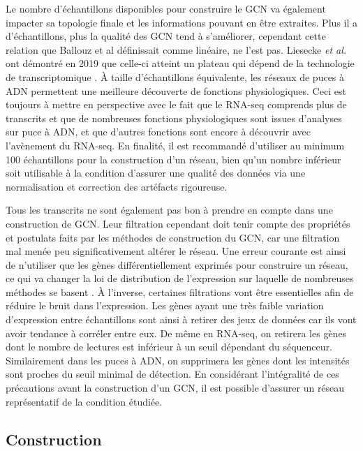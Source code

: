 Le nombre d'échantillons disponibles pour construire le \acrshort{GCN} va également impacter sa topologie finale et les informations pouvant en être extraites. Plus il a d'échantillons, plus la qualité des \acrshort{GCN} tend à s'améliorer, cependant cette relation que Ballouz et al définissait comme linéaire, ne l'est pas. Liesecke \textit{et al.} ont démontré en 2019 que celle-ci atteint un plateau qui dépend de la technologie de transcriptomique \cite{Liesecke2019}. À taille d'échantillons équivalente, les réseaux de puces à \acrshort{ADN} permettent une meilleure découverte de fonctions physiologiques. Ceci est toujours à mettre en perspective avec le fait que le \acrshort{RNA-seq} comprends plus de transcrits et que de nombreuses fonctions physiologiques sont issues d'analyses sur puce à \acrshort{ADN}, et que d'autres fonctions sont encore à découvrir avec l'avènement du \acrshort{RNA-seq}. En finalité, il est recommandé d'utiliser au minimum 100 échantillons pour la construction d'un réseau, bien qu'un nombre inférieur soit utilisable à la condition d'assurer une qualité des données via une normalisation et correction des artéfacts rigoureuse. 

Tous les transcrits ne sont également pas bon à prendre en compte dans une construction de \acrshort{GCN}. Leur filtration cependant doit tenir compte des propriétés et postulats faits par les méthodes de construction du \acrshort{GCN}, car une filtration mal menée peu significativement altérer le réseau. Une erreur courante est ainsi de n'utiliser que les gènes différentiellement exprimés pour construire un réseau, ce qui va changer la loi de distribution de l'expression sur laquelle de nombreuses méthodes se basent \cite{Zhang2005a}. À l'inverse, certaines filtrations vont être essentielles afin de réduire le bruit dans l'expression. Les gènes ayant une très faible variation d'expression entre échantillons sont ainsi à retirer des jeux de données car ils vont avoir tendance à corréler entre eux. De même en \acrshort{RNA-seq}, on retirera les gènes dont le nombre de lectures est inférieur à un seuil dépendant du séquenceur. Similairement dans les puces à \acrshort{ADN}, on supprimera les gènes dont les intensités sont proches du seuil minimal de détection. En considérant l'intégralité de ces précautions avant la construction d'un \acrshort{GCN}, il est possible d'assurer un réseau représentatif de la condition étudiée.



\subsection{Construction}

